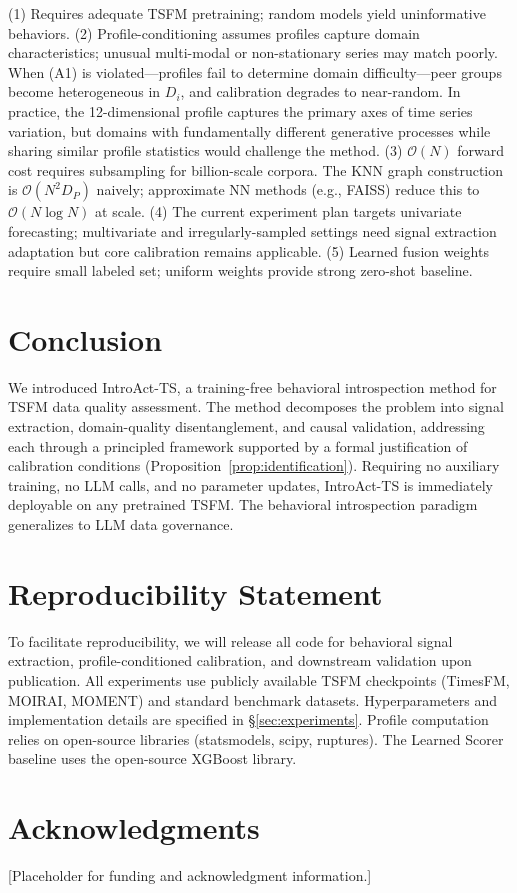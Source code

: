 \documentclass{article}
\begin{document}
(1) Requires adequate TSFM pretraining; random models yield uninformative behaviors. (2) Profile-conditioning assumes profiles capture domain characteristics; unusual multi-modal or non-stationary series may match poorly. When (A1) is violated---profiles fail to determine domain difficulty---peer groups become heterogeneous in $D_i$, and calibration degrades to near-random. In practice, the 12-dimensional profile captures the primary axes of time series variation, but domains with fundamentally different generative processes while sharing similar profile statistics would challenge the method. (3) $\mathcal{O}(N)$ forward cost requires subsampling for billion-scale corpora. The KNN graph construction is $\mathcal{O}(N^2 D_P)$ naively; approximate NN methods (e.g., FAISS) reduce this to $\mathcal{O}(N \log N)$ at scale. (4) The current experiment plan targets univariate forecasting; multivariate and irregularly-sampled settings need signal extraction adaptation but core calibration remains applicable. (5) Learned fusion weights require small labeled set; uniform weights provide strong zero-shot baseline.

\section{Conclusion}

We introduced IntroAct-TS, a training-free behavioral introspection method for TSFM data quality assessment. The method decomposes the problem into signal extraction, domain-quality disentanglement, and causal validation, addressing each through a principled framework supported by a formal justification of calibration conditions (Proposition~\ref{prop:identification}). Requiring no auxiliary training, no LLM calls, and no parameter updates, IntroAct-TS is immediately deployable on any pretrained TSFM. The behavioral introspection paradigm generalizes to LLM data governance.

\section*{Reproducibility Statement}
To facilitate reproducibility, we will release all code for behavioral signal extraction, profile-conditioned calibration, and downstream validation upon publication. All experiments use publicly available TSFM checkpoints (TimesFM, MOIRAI, MOMENT) and standard benchmark datasets. Hyperparameters and implementation details are specified in \S\ref{sec:experiments}. Profile computation relies on open-source libraries (statsmodels, scipy, ruptures). The Learned Scorer baseline uses the open-source XGBoost library.

\section*{Acknowledgments}
[Placeholder for funding and acknowledgment information.]



\end{document}
